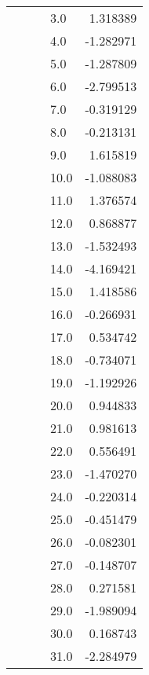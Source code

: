 \begin{tabular}{llllr}
                        &        &              &  3.0  &  1.318389 \\
                        &        &              &  4.0  & -1.282971 \\
                        &        &              &  5.0  & -1.287809 \\
                        &        &              &  6.0  & -2.799513 \\
                        &        &              &  7.0  & -0.319129 \\
                        &        &              &  8.0  & -0.213131 \\
                        &        &              &  9.0  &  1.615819 \\
                        &        &              &  10.0 & -1.088083 \\
                        &        &              &  11.0 &  1.376574 \\
                        &        &              &  12.0 &  0.868877 \\
                        &        &              &  13.0 & -1.532493 \\
                        &        &              &  14.0 & -4.169421 \\
                        &        &              &  15.0 &  1.418586 \\
                        &        &              &  16.0 & -0.266931 \\
                        &        &              &  17.0 &  0.534742 \\
                        &        &              &  18.0 & -0.734071 \\
                        &        &              &  19.0 & -1.192926 \\
                        &        &              &  20.0 &  0.944833 \\
                        &        &              &  21.0 &  0.981613 \\
                        &        &              &  22.0 &  0.556491 \\
                        &        &              &  23.0 & -1.470270 \\
                        &        &              &  24.0 & -0.220314 \\
                        &        &              &  25.0 & -0.451479 \\
                        &        &              &  26.0 & -0.082301 \\
                        &        &              &  27.0 & -0.148707 \\
                        &        &              &  28.0 &  0.271581 \\
                        &        &              &  29.0 & -1.989094 \\
                        &        &              &  30.0 &  0.168743 \\
                        &        &              &  31.0 & -2.284979 \\
\bottomrule
\end{tabular}
